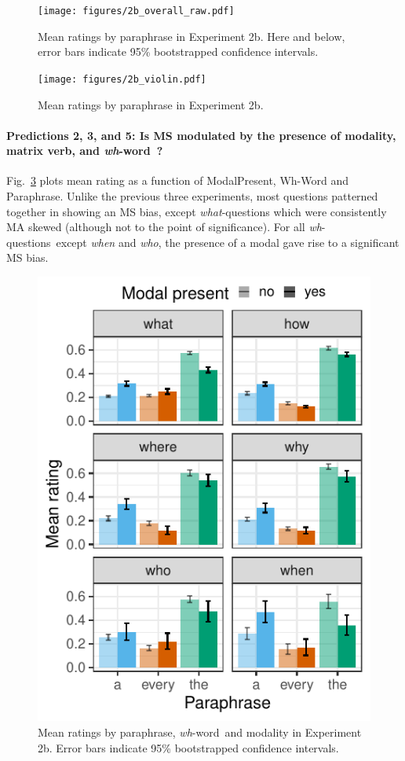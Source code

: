 \documentclass[12pt,letterpaper,table,svgnames,dvipsnames]{article}
\newcommand{\figref}[1]{Fig.~\ref{#1}}
\newcommand{\whqs}{\emph{wh}-questions~}
\newcommand{\whw}{\emph{wh}-word~}
\begin{document}
\begin{figure}[h!]
\centering
\texttt{[image: figures/2b\_overall\_raw.pdf]}
\caption{Mean ratings by paraphrase in Experiment 2b. Here and below, error bars indicate 95\% bootstrapped confidence intervals.}
\label{ex2b_overall}
\end{figure}

\begin{figure}[h!]
\centering
\texttt{[image: figures/2b\_violin.pdf]}
\caption{Mean ratings by paraphrase in Experiment 2b.}
\label{ex2b_violin}
\end{figure}
\newpage

\paragraph{Predictions 2, 3, and 5: Is MS modulated by the presence of modality, matrix verb, and \whw?}
\figref{ex2b_modXwh} plots mean rating as a function of ModalPresent, Wh-Word and Paraphrase. Unlike the previous three experiments, most questions patterned together in showing an MS bias, except \emph{what}-questions which were consistently MA skewed (although not to the point of significance). For all \whqs except \emph{when} and \emph{who}, the presence of a modal gave rise to a significant MS bias. 

\begin{figure}[h!]
\centering
\includegraphics[scale=1]{figures/modxwh_nocontext_embedded.pdf}
\caption{Mean ratings by paraphrase, \whw and modality in Experiment 2b. Error bars indicate 95\% bootstrapped confidence intervals.} 
\label{ex2b_modXwh}
\end{figure}
\end{document}
